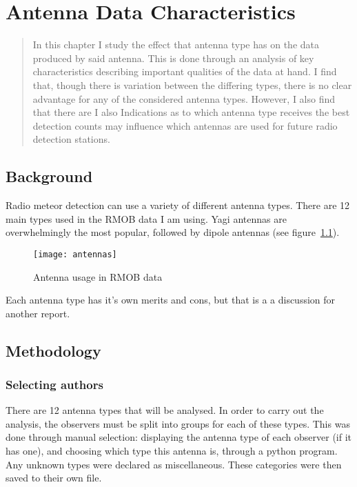 \chapter{Antenna Data Characteristics}
\label{chap:antenna}
\begin{strip}
	\begin{minipage}{\textwidth}
		\begin{abstract}
			In this chapter I study the effect that antenna type has on the data produced by said antenna. This is done through an analysis of key characteristics describing important qualities of the data at hand. I find that, though there is variation between the differing types, there is no clear advantage for any of the considered antenna types. However, I also find that there are  I also Indications as to which antenna type receives the best detection counts may influence which antennas are used for future radio detection stations.
		\end{abstract}
	\end{minipage}
\end{strip}
\section{Background}
Radio meteor detection can use a variety of different antenna types. There are 12 main types used in the RMOB data I am using. Yagi antennas are overwhelmingly the most popular, followed by dipole antennas (see figure~\ref{fig:antennas}).
\begin{figure}[h!]
	\centering
	\texttt{[image: antennas]}
	\caption{Antenna usage in RMOB data \label{fig:antennas}}
\end{figure}
Each antenna type has it's own merits and cons, but that is a a discussion for another report. 
\section{Methodology}
\subsection{Selecting authors}
There are 12 antenna types that will be analysed. In order to carry out the analysis, the observers must be split into groups for each of these types. This was done through  manual selection: displaying the antenna type of each observer (if it has one), and choosing which type this antenna is, through a python program. Any unknown types were declared as miscellaneous. These categories were then saved to their own file.
